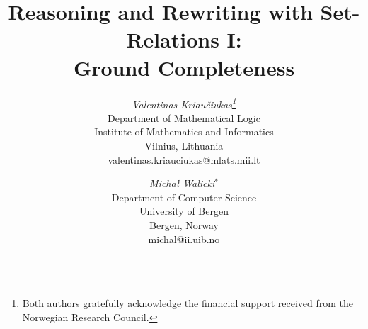 \newcommand{\restrict}{\mathbin{\mbox{\msym\symbol{22}}}}
\newcommand{\List}[3]{#1_{1}#3\ldots#3#1_{#2}}
\newcommand{\col}[1]{\renewcommand{\arraystretch}{0.4} \begin{array}[t]{c} #1
  \end{array}}
\newcommand{\prule}[2]{{\displaystyle #1 \over \displaystyle#2}}
\newcommand{\newITEM}[1]{\gdef\ITEMlabel{ITEM:#1-}\setcounter{ITEM}{0}}
\makeatletter
\def\l@bel#1${\edef\@currentlabel{(\roman{ITEM})}\label{#1}}
\newcommand{\ITEM}[2]{\par\addvspace{.7ex}\noindent
   \refstepcounter{ITEM}\expandafter\l@bel\ITEMlabel#1${\advance\linewidth-2em
   \hskip2em \parbox{\linewidth}{\hskip-2em {\rm\bf \@currentlabel\
   }\ignorespaces #2}}\par \addvspace{.7ex}\noindent\ignorespaces}
\def\R@f#1${\ref{#1}}
\newcommand{\?}[1]{\expandafter\R@f\ITEMlabel#1$}
\makeatother
\newcommand{\PROOFRULE}[2]{\trivlist\item[\hskip\labelsep {\bf #1}]#2\par
  \addvspace{1ex}\noindent\ignorespaces}
\newenvironment{clauses}{\begin{array}{r@{.\ \ }r@{\;\Seq\;}l}}{\end{array}}
\newcommand{\Cs}{\varepsilon}
\newcommand{\const}[3]{\Cs_{\scriptscriptstyle#2}(#1,#3)}
\newcommand{\Ein}{\sqsubset}%
\newcommand{\Eineq}{\sqsubseteq}%


\voffset -2cm



\title{Reasoning and Rewriting with Set-Relations I: \\Ground Completeness}

\author{ {\it Valentinas Kriau\v ciukas\thanks{Both authors gratefully 
acknowledge the financial support received from the Norwegian Research Council.}}\\
\small Department of Mathematical Logic\\
\small Institute of Mathematics and Informatics\\
\small Vilnius, Lithuania\\
\footnotesize valentinas.kriauciukas@mlats.mii.lt 
\and 
{\it Micha{\l} Walicki\(^*\)}\\
\small Department of Computer Science\\
\small University of Bergen\\
\small Bergen, Norway\\
\footnotesize michal@ii.uib.no}

